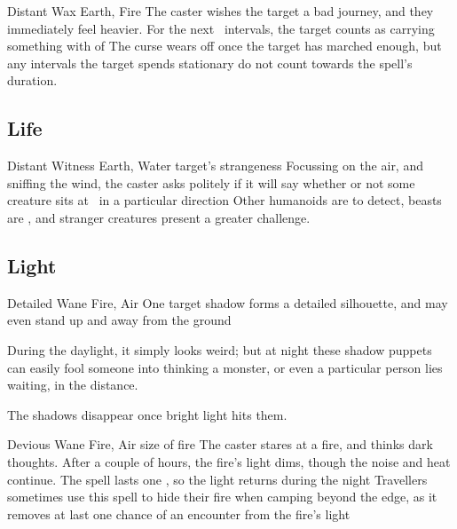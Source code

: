 \begin{multicols}{2}
  {Distant}%
  {Wax}%
  {Earth, Fire}%
  {}%
  {The caster wishes the target a bad journey, and they immediately feel heavier.
  For the next ~\glspl{interval}, the target counts as carrying something with  of }%
  {
  The curse wears off once the target has marched enough, but any \glspl{interval} the target spends stationary do not count towards the spell's duration.}

\subsection{Life}


  {Distant}%
  {Witness}%
  {Earth, Water}%
  {target's strangeness}%
  {Focussing on the air, and sniffing the wind, the caster asks politely if it will say whether or not some creature sits at \spellRange\ in a particular direction}%
  {Other humanoids are \tn[7] to detect, beasts are \tn[9], and stranger creatures present a greater challenge.}


\subsection{Light}



  {Detailed}%
  {Wane}%
  {Fire, Air}%
  {}%
  {One target shadow forms a detailed silhouette, and may even stand up and away from the ground}%
  {During the daylight, it simply looks weird; but at night these shadow puppets can easily fool someone into thinking a monster, or even a particular person lies waiting, in the distance.

  The shadows disappear once bright light hits them.}

  {Devious}%
  {Wane}%
  {Fire, Air}%
  {size of fire}%
  {The caster stares at a fire, and thinks dark thoughts.
  After a couple of hours, the fire's light dims, though the noise and heat continue.
  The spell lasts one \showOnset, so the light returns during the night}%
  {Travellers sometimes use this spell to hide their fire when camping beyond the \gls{edge}, as it removes at last one chance of an encounter from the fire's light}


\end{multicols}
